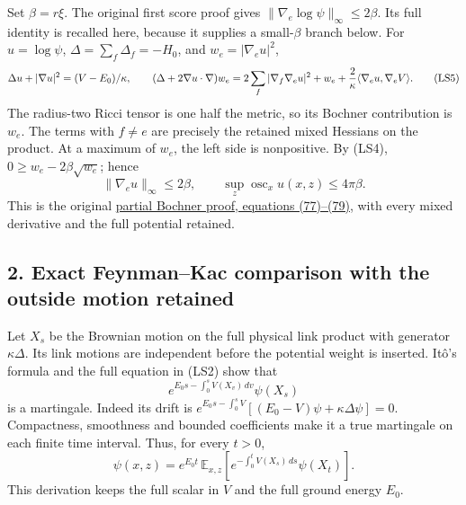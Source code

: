 \documentclass[11pt]{article}
\begin{document}
Set \(\beta=r\xi\). The original first score proof gives
\(\|\nabla_e\log\psi\|_\infty\le2\beta\). Its full identity is
recalled here, because it supplies a small-\(\beta\) branch below.
For \(u=\log\psi\), \(\Delta=\sum_f\Delta_f=-H_0\), and
\(w_e=|\nabla_eu|^2\),
\[
 \Delta u+|\nabla u|^2=(V-E_0)/\kappa,\qquad
 (\Delta+2\nabla u\cdot\nabla)w_e
 =2\sum_f|\nabla_f\nabla_eu|^2+w_e
       +{2\over\kappa}\langle\nabla_eu,\nabla_eV\rangle.
 \tag{LS5}
\]
The radius-two Ricci tensor is one half the metric, so its
Bochner contribution is \(w_e\). The terms with \(f\ne e\)
are precisely the retained mixed Hessians on the product.
At a maximum of \(w_e\), the left side is nonpositive. By (LS4),
\(0\ge w_e-2\beta\sqrt{w_e}\); hence
\[
 \|\nabla_eu\|_\infty\le2\beta,\qquad
 \sup_z\operatorname{osc}_{x}u(x,z)\le4\pi\beta.
 \tag{LS6}
\]
This is the original
\href{https://github.com/KokunoYumeto/yang-mills-interacting-workbench/blob/485b61423c1f4e1805deb453c1b6b342b27842b6/yang-mills/continuations/20260930-s6-ns-moment-map-bridge/sources/spatial/spatial_continuum.tex#L1415}{partial Bochner proof, equations (77)–(79)},
with every mixed derivative and the full potential retained.

\subsection*{2. Exact Feynman–Kac comparison with the outside motion retained}

Let \(X_s\) be the Brownian motion on the full physical link
product with generator \(\kappa\Delta\). Its link motions are
independent before the potential weight is inserted. Itô's
formula and the full equation in (LS2) show that
\[
 e^{E_0s-\int_0^s V(X_v)\,dv}\psi(X_s)
 \]
is a martingale. Indeed its drift is
\(e^{E_0s-\int_0^sV}[(E_0-V)\psi+\kappa\Delta\psi]=0\).
Compactness, smoothness and bounded coefficients make it a true
martingale on each finite time interval. Thus, for every \(t>0\),
\[
 \psi(x,z)=e^{E_0t}\,
 \mathbb E_{x,z}\!\left[e^{-\int_0^tV(X_s)\,ds}\psi(X_t)\right].
 \tag{LS7}
\]
This derivation keeps the full scalar in \(V\) and the full
ground energy \(E_0\).
\end{document}
